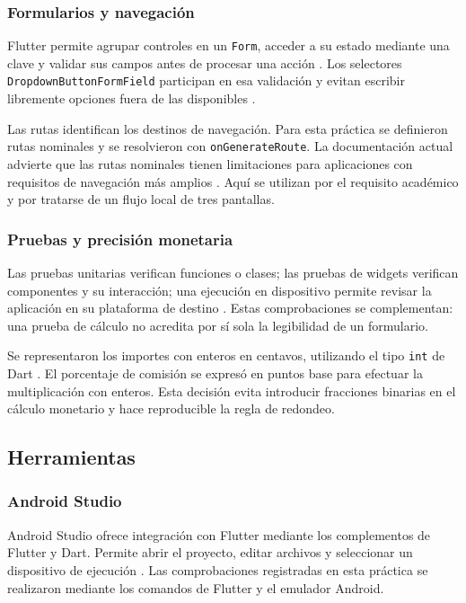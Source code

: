 \documentclass[12pt,letterpaper]{article}
\begin{document}
\subsubsection{Formularios y navegación}
Flutter permite agrupar controles en un \texttt{Form}, acceder a su estado mediante una clave y validar sus campos antes de procesar una acción \citep{flutterformularios}. Los selectores \texttt{DropdownButtonFormField} participan en esa validación y evitan escribir libremente opciones fuera de las disponibles \citep{flutterselector}.

Las rutas identifican los destinos de navegación. Para esta práctica se definieron rutas nominales y se resolvieron con \texttt{onGenerateRoute}. La documentación actual advierte que las rutas nominales tienen limitaciones para aplicaciones con requisitos de navegación más amplios \citep{flutterrutas}. Aquí se utilizan por el requisito académico y por tratarse de un flujo local de tres pantallas.

\subsubsection{Pruebas y precisión monetaria}
Las pruebas unitarias verifican funciones o clases; las pruebas de widgets verifican componentes y su interacción; una ejecución en dispositivo permite revisar la aplicación en su plataforma de destino \citep{flutterpruebas}. Estas comprobaciones se complementan: una prueba de cálculo no acredita por sí sola la legibilidad de un formulario.

Se representaron los importes con enteros en centavos, utilizando el tipo \texttt{int} de Dart \citep{darttipos}. El porcentaje de comisión se expresó en puntos base para efectuar la multiplicación con enteros. Esta decisión evita introducir fracciones binarias en el cálculo monetario y hace reproducible la regla de redondeo.

\subsection{Herramientas}
\subsubsection{Android Studio}
Android Studio ofrece integración con Flutter mediante los complementos de Flutter y Dart. Permite abrir el proyecto, editar archivos y seleccionar un dispositivo de ejecución \citep{flutteride}. Las comprobaciones registradas en esta práctica se realizaron mediante los comandos de Flutter y el emulador Android.
\end{document}

